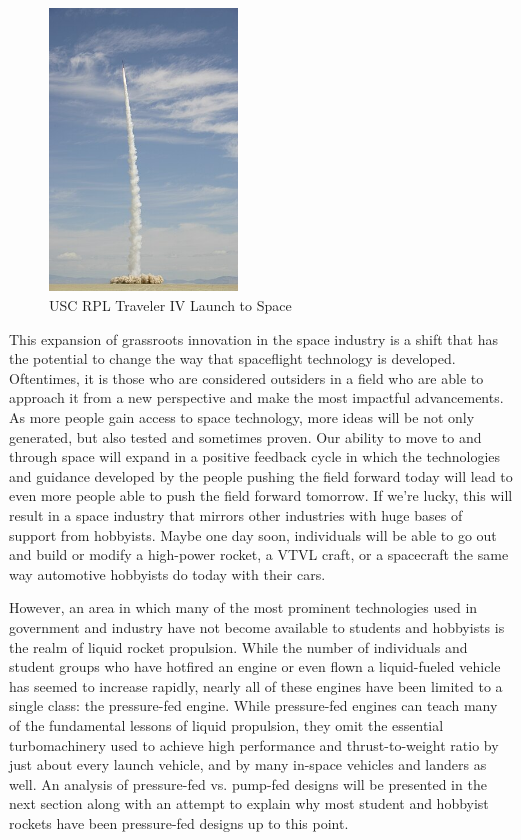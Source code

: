 \documentclass[12pt, letterpaper]{article}
\begin{document}
\begin{figure}
    \centering
    \includegraphics[width=5cm]{Kluft-photo-CSXT-2004-amateur-space-launch.jpg}
    \caption{USC RPL Traveler IV Launch to Space}
\end{figure}

    
\newpage

This expansion of grassroots innovation in the space industry is a shift that has the potential to change the way that spaceflight technology is developed. Oftentimes, it is those who are considered outsiders in a field who are able to approach it from a new perspective and make the most impactful advancements. As more people gain access to space technology, more ideas will be not only generated, but also tested and sometimes proven. Our ability to move to and through space will expand in a positive feedback cycle in which the technologies and guidance developed by the people pushing the field forward today will lead to even more people able to push the field forward tomorrow. If we're lucky, this will result in a space industry that mirrors other industries with huge bases of support from hobbyists. Maybe one day soon, individuals will be able to go out and build or modify a high-power rocket, a VTVL craft, or a spacecraft the same way automotive hobbyists do today with their cars.

However, an area in which many of the most prominent technologies used in government and industry have not become available to students and hobbyists is the realm of liquid rocket propulsion. While the number of individuals and student groups who have hotfired an engine or even flown a liquid-fueled vehicle has seemed to increase rapidly, nearly all of these engines have been limited to a single class: the pressure-fed engine. While pressure-fed engines can teach many of the fundamental lessons of liquid propulsion, they omit the essential turbomachinery used to achieve high performance and thrust-to-weight ratio by just about every launch vehicle, and by many in-space vehicles and landers as well. An analysis of pressure-fed vs. pump-fed designs will be presented in the next section along with an attempt to explain why most student and hobbyist rockets have been pressure-fed designs up to this point.
\end{document}
